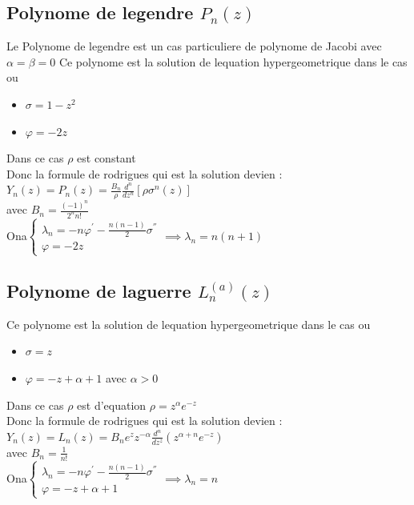 \documentclass[12pt]{book}
\begin{document}
            \subsection*{Polynome de legendre $P_n(z)$}
                Le Polynome de legendre est un cas particuliere de polynome de Jacobi avec $ \alpha = \beta =0 $
                Ce polynome est la solution de lequation hypergeometrique dans le cas ou 
                \begin{itemize}
                    \item $\sigma = 1-z^2$
                    \item $\varphi = -2z$
                \end{itemize} 
                Dans ce cas $\rho$ est constant  \\
                Donc la formule de rodrigues qui est la solution devien : \\
                $ Y_n(z) = P_n(z) =  \frac{B_n}{\rho}\frac{d^n}{dz^n}\left[\rho\sigma^n(z)\right] $ \\
                avec $B_n = \frac{(-1)^n}{2^nn!}$\\
                Ona$ \begin{cases}
                    \lambda_n = -n\varphi^{'} - \frac{n(n-1)}{2}\sigma^{''} \\
                    \varphi = -2z
                \end{cases} \implies \lambda_n = n(n+1)$ 
            \subsection*{Polynome de laguerre $L_n^{(a)}(z)$}
                Ce polynome est la solution de lequation hypergeometrique dans le cas ou 
                \begin{itemize}
                    \item $\sigma = z$
                    \item $\varphi = -z +\alpha +1$ avec $ \alpha > 0 $
                \end{itemize} 
                Dans ce cas $\rho$ est d'equation $\rho = z^\alpha e^{-z}$  \\
                Donc la formule de rodrigues qui est la solution devien : \\
                $ Y_n(z) = L_n(z) =  B_ne^zz^{-\alpha}\frac{d^n}{dz^z}(z^{\alpha + n}e^{-z}) $ \\
                avec $B_n = \frac{1}{n!}$\\
                Ona$ \begin{cases}
                    \lambda_n = -n\varphi^{'} - \frac{n(n-1)}{2}\sigma^{''} \\
                    \varphi  = -z +\alpha +1
                \end{cases} \implies \lambda_n = n$ 
\end{document}
